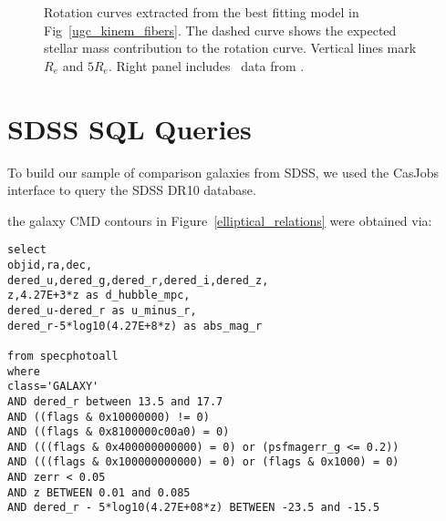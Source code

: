\documentclass{emulateapj}
\newcommand\HI{\ion{H}{1}}
\begin{document}
\begin{figure*}
\caption{Rotation curves extracted from the best fitting model in Fig~\ref{ugc_kinem_fibers}.  The dashed curve shows the expected stellar mass contribution to the rotation curve.  Vertical lines mark $R_e$ and $5R_e$.  Right panel includes \HI\ data from \citet{Pickering97}. \label{ugc_kinem}}
\end{figure*}




\clearpage

\appendix
\section{SDSS SQL Queries} \label{SQL}
To build our sample of comparison galaxies from SDSS, we used the CasJobs interface to query the SDSS DR10 database.


the galaxy CMD contours in Figure~\ref{elliptical_relations} were obtained via:
\begin{verbatim}
select 
objid,ra,dec,
dered_u,dered_g,dered_r,dered_i,dered_z,
z,4.27E+3*z as d_hubble_mpc,
dered_u-dered_r as u_minus_r,
dered_r-5*log10(4.27E+8*z) as abs_mag_r 

from specphotoall
where
class='GALAXY'
AND dered_r between 13.5 and 17.7
AND ((flags & 0x10000000) != 0)
AND ((flags & 0x8100000c00a0) = 0)
AND (((flags & 0x400000000000) = 0) or (psfmagerr_g <= 0.2))
AND (((flags & 0x100000000000) = 0) or (flags & 0x1000) = 0)
AND zerr < 0.05
AND z BETWEEN 0.01 and 0.085
AND dered_r - 5*log10(4.27E+08*z) BETWEEN -23.5 and -15.5
\end{verbatim}
\end{document}
